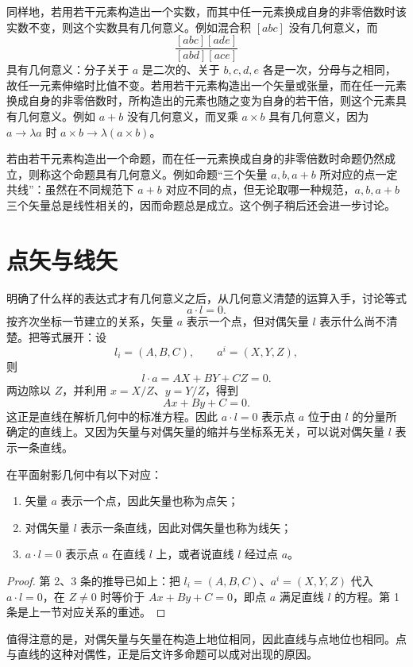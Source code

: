 同样地，若用若干元素构造出一个实数，而其中任一元素换成自身的非零倍数时该实数不变，则这个实数具有几何意义。例如混合积 $[abc]$ 没有几何意义，而
\[
\frac{[abc][ade]}{[abd][ace]}
\]
具有几何意义：分子关于 $a$ 是二次的、关于 $b,c,d,e$ 各是一次，分母与之相同，故任一元素伸缩时比值不变。若用若干元素构造出一个矢量或张量，而在任一元素换成自身的非零倍数时，所构造出的元素也随之变为自身的若干倍，则这个元素具有几何意义。例如 $a+b$ 没有几何意义，而叉乘 $a\times b$ 具有几何意义，因为 $a\to\lambda a$ 时 $a\times b\to\lambda(a\times b)$。

若由若干元素构造出一个命题，而在任一元素换成自身的非零倍数时命题仍然成立，则称这个命题具有几何意义。例如命题“三个矢量 $a,b,a+b$ 所对应的点一定共线”：虽然在不同规范下 $a+b$ 对应不同的点，但无论取哪一种规范，$a,b,a+b$ 三个矢量总是线性相关的，因而命题总是成立。这个例子稍后还会进一步讨论。

\section{点矢与线矢}

明确了什么样的表达式才有几何意义之后，从几何意义清楚的运算入手，讨论等式
\[
a\cdot l=0 .
\]
按齐次坐标一节建立的关系，矢量 $a$ 表示一个点，但对偶矢量 $l$ 表示什么尚不清楚。把等式展开：设
\[
l_i=(A,B,C),\qquad a^i=(X,Y,Z),
\]
则
\[
l\cdot a=AX+BY+CZ=0 .
\]
两边除以 $Z$，并利用 $x=X/Z$、$y=Y/Z$，得到
\[
Ax+By+C=0 .
\]
这正是直线在解析几何中的标准方程。因此 $a\cdot l=0$ 表示点 $a$ 位于由 $l$ 的分量所确定的直线上。又因为矢量与对偶矢量的缩并与坐标系无关，可以说对偶矢量 $l$ 表示一条直线。

\begin{proposition}[点矢与线矢]
在平面射影几何中有以下对应：
\begin{enumerate}
\item 矢量 $a$ 表示一个点，因此矢量也称为点矢；
\item 对偶矢量 $l$ 表示一条直线，因此对偶矢量也称为线矢；
\item $a\cdot l=0$ 表示点 $a$ 在直线 $l$ 上，或者说直线 $l$ 经过点 $a$。
\end{enumerate}
\end{proposition}

\begin{proof}
第 2、3 条的推导已如上：把 $l_i=(A,B,C)$、$a^i=(X,Y,Z)$ 代入 $a\cdot l=0$，在 $Z\neq 0$ 时等价于 $Ax+By+C=0$，即点 $a$ 满足直线 $l$ 的方程。第 1 条是上一节对应关系的重述。
\end{proof}

值得注意的是，对偶矢量与矢量在构造上地位相同，因此直线与点地位也相同。点与直线的这种对偶性，正是后文许多命题可以成对出现的原因。


